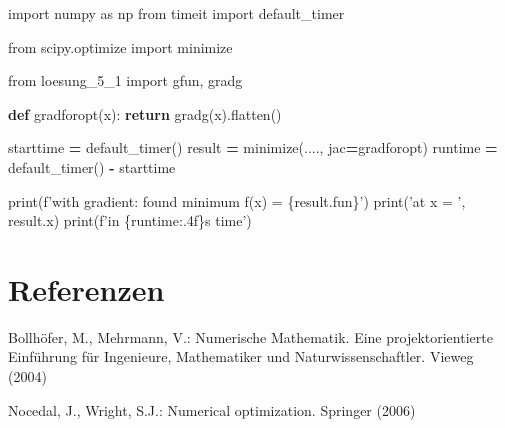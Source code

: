 \documentclass[]{book}
\newenvironment{Shaded}{\begin{snugshade}}{\end{snugshade}}
\newcommand{\BuiltInTok}[1]{#1}
\newcommand{\ControlFlowTok}[1]{\textcolor[rgb]{0.13,0.29,0.53}{\textbf{#1}}}
\newcommand{\ImportTok}[1]{#1}
\newcommand{\KeywordTok}[1]{\textcolor[rgb]{0.13,0.29,0.53}{\textbf{#1}}}
\newcommand{\NormalTok}[1]{#1}
\newcommand{\OperatorTok}[1]{\textcolor[rgb]{0.81,0.36,0.00}{\textbf{#1}}}
\newcommand{\SpecialCharTok}[1]{\textcolor[rgb]{0.00,0.00,0.00}{#1}}
\newcommand{\SpecialStringTok}[1]{\textcolor[rgb]{0.31,0.60,0.02}{#1}}
\newcommand{\StringTok}[1]{\textcolor[rgb]{0.31,0.60,0.02}{#1}}
\theoremstyle{definition}
\theoremstyle{definition}
\theoremstyle{definition}
\theoremstyle{definition}
\theoremstyle{remark}
\begin{document}
\begin{Shaded}
\begin{Highlighting}[]
\ImportTok{import}\NormalTok{ numpy }\ImportTok{as}\NormalTok{ np}
\ImportTok{from}\NormalTok{ timeit }\ImportTok{import}\NormalTok{ default_timer}

\ImportTok{from}\NormalTok{ scipy.optimize }\ImportTok{import}\NormalTok{ minimize}

\ImportTok{from}\NormalTok{ loesung_5_1 }\ImportTok{import}\NormalTok{ gfun, gradg}


\KeywordTok{def}\NormalTok{ gradforopt(x):}
    \ControlFlowTok{return}\NormalTok{ gradg(x).flatten()}


\NormalTok{starttime }\OperatorTok{=}\NormalTok{ default_timer()}
\NormalTok{result }\OperatorTok{=}\NormalTok{ minimize(...., jac}\OperatorTok{=}\NormalTok{gradforopt)}
\NormalTok{runtime }\OperatorTok{=}\NormalTok{ default_timer() }\OperatorTok{-}\NormalTok{ starttime}

\BuiltInTok{print}\NormalTok{(}\SpecialStringTok{f'with gradient: found minimum f(x) = }\SpecialCharTok{\{}\NormalTok{result}\SpecialCharTok{.}\NormalTok{fun}\SpecialCharTok{\}}\SpecialStringTok{'}\NormalTok{)}
\BuiltInTok{print}\NormalTok{(}\StringTok{'at x = '}\NormalTok{, result.x)}
\BuiltInTok{print}\NormalTok{(}\SpecialStringTok{f'in }\SpecialCharTok{\{}\NormalTok{runtime}\SpecialCharTok{:.4f\}}\SpecialStringTok{s time'}\NormalTok{)}
\end{Highlighting}
\end{Shaded}

\hypertarget{referenzen}{%
\chapter*{Referenzen}\label{referenzen}}

\hypertarget{refs}{}
\leavevmode\hypertarget{ref-BolM04}{}%
Bollhöfer, M., Mehrmann, V.: Numerische Mathematik. Eine projektorientierte Einführung für Ingenieure, Mathematiker und Naturwissenschaftler. Vieweg (2004)

\leavevmode\hypertarget{ref-NocW06}{}%
Nocedal, J., Wright, S.J.: Numerical optimization. Springer (2006)
\end{document}
